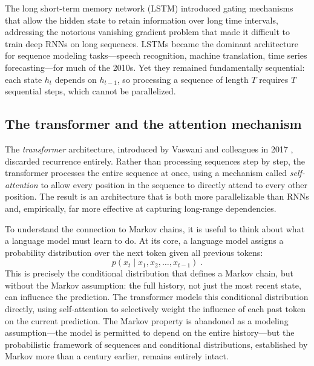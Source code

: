 \medskip

The long short-term memory network (LSTM) \cite{hochreiter_1997_lstm} introduced gating mechanisms that allow the hidden state to retain information over long time intervals, addressing the notorious vanishing gradient problem that made it difficult to train deep RNNs on long sequences. LSTMs became the dominant architecture for sequence modeling tasks---speech recognition, machine translation, time series forecasting---for much of the 2010s. Yet they remained fundamentally sequential: each state $h_t$ depends on $h_{t-1}$, so processing a sequence of length $T$ requires $T$ sequential steps, which cannot be parallelized.

\subsection{The transformer and the attention mechanism}

The \textit{transformer} architecture, introduced by Vaswani and colleagues in 2017 \cite{vaswani_2017_attention}, discarded recurrence entirely. Rather than processing sequences step by step, the transformer processes the entire sequence at once, using a mechanism called \textit{self-attention} to allow every position in the sequence to directly attend to every other position. The result is an architecture that is both more parallelizable than RNNs and, empirically, far more effective at capturing long-range dependencies.

\medskip

To understand the connection to Markov chains, it is useful to think about what a language model must learn to do. At its core, a language model assigns a probability distribution over the next token given all previous tokens:
\begin{equation}
    p(x_t \mid x_1, x_2, \dots, x_{t-1}) \; .
\end{equation}
This is precisely the conditional distribution that defines a Markov chain, but without the Markov assumption: the full history, not just the most recent state, can influence the prediction. The transformer models this conditional distribution directly, using self-attention to selectively weight the influence of each past token on the current prediction. The Markov property is abandoned as a modeling assumption---the model is permitted to depend on the entire history---but the probabilistic framework of sequences and conditional distributions, established by Markov more than a century earlier, remains entirely intact.

